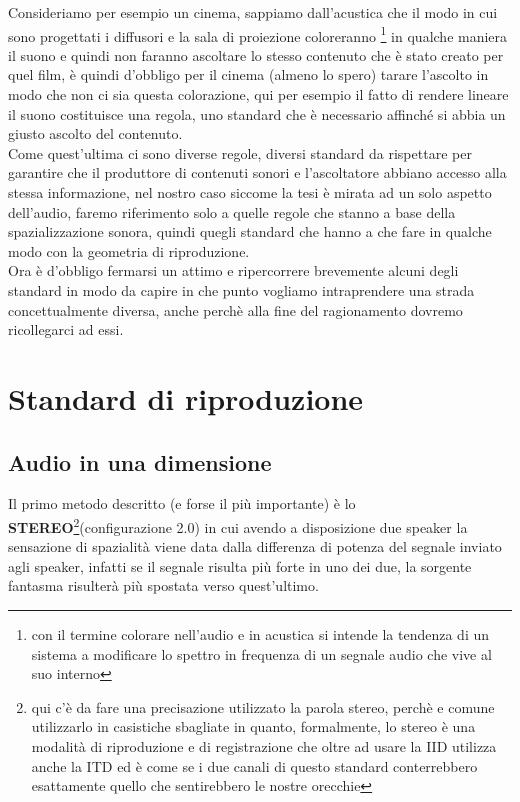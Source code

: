 \documentclass[12pt,a4paper]{report}
\begin{document}
Consideriamo per esempio un cinema, sappiamo dall'acustica che il modo in cui sono progettati i diffusori e la sala di proiezione coloreranno \footnote{con il termine colorare nell'audio e in acustica si intende la tendenza di un sistema a modificare lo spettro in frequenza di un segnale audio che vive al suo interno} in qualche maniera il suono e quindi non faranno ascoltare lo stesso contenuto che è stato creato per quel film, è quindi d'obbligo per il cinema (almeno lo spero) tarare l'ascolto in modo che non ci sia questa colorazione, qui per esempio il fatto di rendere lineare il suono costituisce una regola, uno standard che è necessario affinché si abbia un giusto ascolto del contenuto.\\

Come quest'ultima ci sono diverse regole, diversi standard da rispettare per garantire che il produttore di contenuti sonori e l'ascoltatore abbiano accesso alla stessa informazione, nel nostro caso siccome la tesi è mirata ad un solo aspetto dell'audio, faremo riferimento solo a quelle regole che stanno a base della spazializzazione sonora, quindi quegli standard che hanno a che fare in qualche modo con la geometria di riproduzione.\\

Ora è d'obbligo fermarsi un attimo e ripercorrere brevemente alcuni degli standard in modo da capire in che punto vogliamo intraprendere una strada concettualmente diversa, anche perchè alla fine del ragionamento dovremo ricollegarci ad essi.


\section{Standard di riproduzione}\label{metodi}

\subsection{Audio in una dimensione}

Il primo metodo descritto (e forse il più importante) è lo \textbf{STEREO}\footnote{qui c'è da fare una precisazione utilizzato la parola stereo, perchè e comune utilizzarlo in casistiche sbagliate in quanto, formalmente, lo stereo è una modalità di riproduzione e di registrazione che oltre ad usare la IID utilizza anche la ITD ed è come se i due canali di questo standard conterrebbero esattamente quello che sentirebbero le nostre orecchie}(configurazione 2.0) in cui avendo a disposizione due speaker la sensazione di spazialità viene data dalla differenza di potenza del segnale inviato agli speaker, infatti se il segnale risulta più forte in uno dei due, la sorgente fantasma risulterà più spostata verso quest'ultimo.\\
\end{document}
